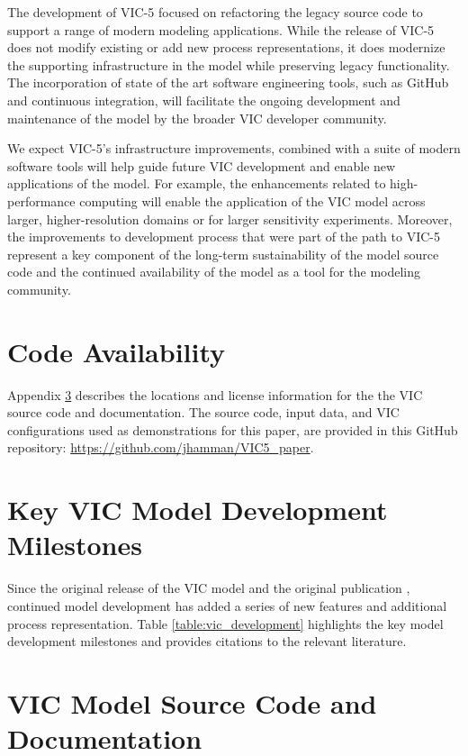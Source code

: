 \documentclass[gmd, manuscript]{copernicus}
\begin{document}
  The development of VIC-5 focused on refactoring the legacy source code to support a range of modern modeling applications. While the release of VIC-5 does not modify existing or add new process representations, it does modernize the supporting infrastructure in the model while preserving legacy functionality. The incorporation of state of the art software engineering tools, such as GitHub and continuous integration, will facilitate the ongoing development and maintenance of the model by the broader VIC developer community.

  We expect VIC-5's infrastructure improvements, combined with a suite of modern software tools will help guide future VIC development and enable new applications of the model. For example, the enhancements related to high-performance computing will enable the application of the VIC model across larger, higher-resolution domains or for larger sensitivity experiments. Moreover, the improvements to development process that were part of the path to VIC-5 represent a key component of the long-term sustainability of the model source code and the continued availability of the model as a tool for the modeling community.

\section{Code Availability}
\label{appendix:code_avail}

  Appendix \ref{appendix:source_code} describes the locations and license information for the the VIC source code and documentation. The source code, input data, and VIC configurations used as demonstrations for this paper, are provided in this GitHub repository: \url{https://github.com/jhamman/VIC5_paper}.

\appendix

\section{Key VIC Model Development Milestones}
\label{appendix:model_development}

Since the original release of the VIC model and the original publication \citet{Liang_1994}, continued model development has added a series of new features and additional process representation. Table \ref{table:vic_development} highlights the key model development milestones and provides citations to the relevant literature.

\section{VIC Model Source Code and Documentation}
\label{appendix:source_code}
\end{document}
